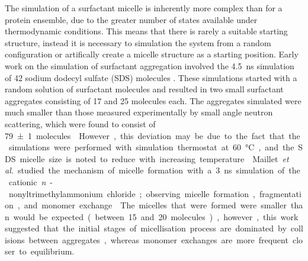 The simulation of a surfactant micelle is inherently more complex than for a protein ensemble, due to the greater number of states available under thermodynamic conditions.
This means that there is rarely a suitable starting structure, instead it is necessary to simulation the system from a random configuration or artifically create a micelle structure as a starting position.
Early work on the simulation of surfactant aggregation involved the \SI{4.5}{\nano\second} simulation of 42 sodium dodecyl sulfate (SDS) molecules \cite{tarek_molecular_1998}.
These simulations started with a random solution of surfactant molecules and resulted in two small surfactant aggregates consisting of 17 and 25 molecules each.
The aggregates simulated were much smaller than those measured experimentally by small angle neutron scattering, which were found to consist of \SI{79\pm1} molecules \cite{hassan_small_2003}.
However, this deviation may be due to the fact that the simulations were performed with simulation thermostat at \SI{60}{\celsius}, and the SDS micelle size is noted to reduce with increasing temperature \cite{hayashi_micelle_1980}.
Maillet \emph{et al.} studied the mechanism of micelle formation with a \SI{3}{\nano\second} simulation of the cationic \emph{n}-nonyltrimethylammonium chloride; observing micelle formation, fragmentation, and monomer exchange \cite{maillet_large_1999}.
The micelles that were formed were smaller than would be expected (between 15 and 20 molecules), however, this work suggested that the initial stages of micellisation process are dominated by collisions between aggregates, whereas monomer exchanges are more frequent closer to equilibrium.

